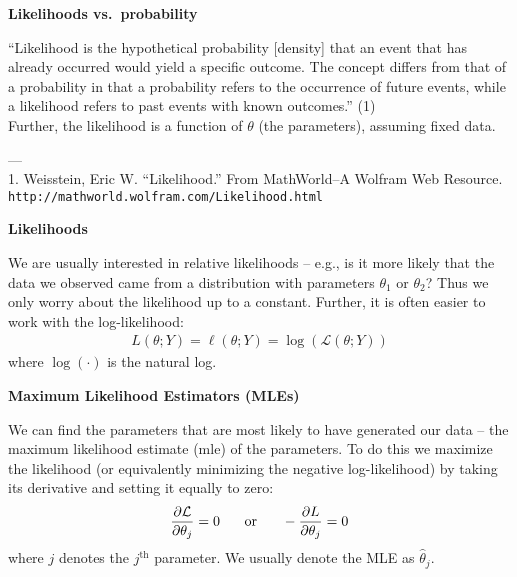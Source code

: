 \documentclass[12pt,xcolor=svgnames]{beamer}
\newcommand{\theme}{\color{FireBrick}}
\newcommand{\mc}[1]{\mathcal{#1}}
\newcommand{\mr}[1]{\mathrm{#1}}
\newcommand{\sk}{\vspace{.4cm}}
\newcommand{\chap}[1]{{\theme \Large \bf #1} \sk}
\newcommand{\mL}{\mc{L}}
\begin{document}
\begin{frame}
\chap{Likelihoods vs.~probability}

``Likelihood is the hypothetical probability [density] that an event that has already occurred would yield a specific outcome. The concept differs from that of a probability in that a probability refers to the occurrence of future events, while a likelihood refers to past events with known outcomes.'' (1) \\
\sk
Further, the likelihood is a function of $\theta$ (the parameters), assuming fixed data. 


\sk
 ---\\
 {\tiny 1. Weisstein, Eric W. ``Likelihood.'' From MathWorld--A Wolfram Web Resource. {\tt http://mathworld.wolfram.com/Likelihood.html} }

\end{frame}



\begin{frame}
\chap{Likelihoods}

We are usually interested in relative likelihoods -- e.g., is it more likely that the data we observed came from a distribution with parameters $\theta_1$ or $\theta_2$? Thus we only worry about the likelihood up to a constant. Further, it is often easier to work with the log-likelihood:
\begin{align*}
L(\theta; Y) = \ell(\theta; Y) = \log(\mL(\theta;Y))
\end{align*}
where $\log(\cdot)$ is the natural log. 

\end{frame}


\begin{frame}
\chap{Maximum Likelihood Estimators (MLEs)}

We can find the parameters that are most likely to have generated our data -- the maximum likelihood estimate (mle) of the parameters. To do this we maximize the likelihood (or equivalently minimizing the negative log-likelihood) by taking its derivative and setting it equally to zero:
\begin{align*}
\frac{\partial \mL}{\partial\theta_j} =0 \text{\hspace{0.5 cm} or \hspace{0.5 cm}}
-\frac{\partial L}{\partial \theta_j} = 0 
\end{align*}
where $j$ denotes the $j^{\mr{th}}$ parameter. We usually denote the MLE as $\hat{\theta}_j$.
\end{frame}
\end{document}
